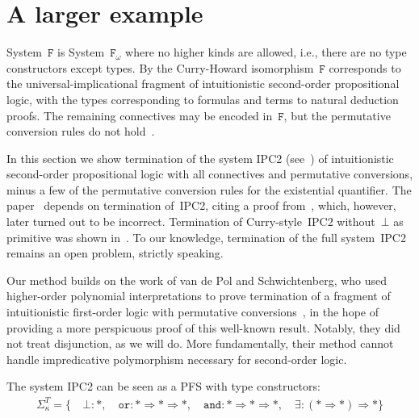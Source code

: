 \documentclass[a4paper,UKenglish,cleveref,autoref,numberwithinsect]{lipics-v2019}
\theoremstyle{definition}
\newcommand{\Fomega}{\mathtt{F}_\omega}
\newcommand{\arrkind}{\Rightarrow}
\begin{document}
\section{A larger example}\label{sec:examples}

System~$\mathtt{F}$ is System~$\Fomega$ where no higher kinds are
allowed, i.e., there are no type constructors except types. By the
Curry-Howard isomorphism~$\mathtt{F}$ corresponds to the
universal-implicational fragment of intuitionistic second-order
propositional logic, with the types corresponding to formulas and
terms to natural deduction proofs. The remaining connectives may be
encoded in~$\mathtt{F}$, but the permutative conversion rules do not
hold~\cite{Girard1989}.

In this section we show
termination of the system IPC2
(see~\cite{SorensenUrzyczyn2010}) of intuitionistic second-order
propositional logic with all connectives and permutative conversions,
minus a few of the permutative conversion rules for the existential
quantifier. The paper~\cite{SorensenUrzyczyn2010} depends on
termination of~IPC2, citing a proof from~\cite{Wojdyga2008}, which,
however, later turned out to be incorrect. Termination of
Curry-style~IPC2 without~$\bot$ as primitive was shown
in~\cite{Tatsuta2007}. To our knowledge, termination of the full
system~IPC2 remains an open problem, strictly speaking.

\begin{remark}
Our method builds on the work of van de Pol and Schwichtenberg, who used
higher-order polynomial interpretations to prove termination of a
fragment of intuitionistic first-order logic with permutative
conversions~\cite{PolSchwichtenberg1995}, in the hope of providing a
more perspicuous proof of this well-known result. Notably, they did
not treat disjunction, as we will do. More fundamentally, their method
cannot handle impredicative polymorphism necessary for second-order
logic.
\end{remark}

The system IPC2 can be seen as a PFS with type constructors:
\[
\begin{array}{c}
\Sigma^T_\kappa = \{\quad
  \bot : *,\quad
  \mathtt{or} : * \arrkind * \arrkind *,\quad
  \mathtt{and} : * \arrkind * \arrkind *,\quad
  \exists : (* \arrkind *) \arrkind *
  \}
\end{array}
\]
\end{document}
